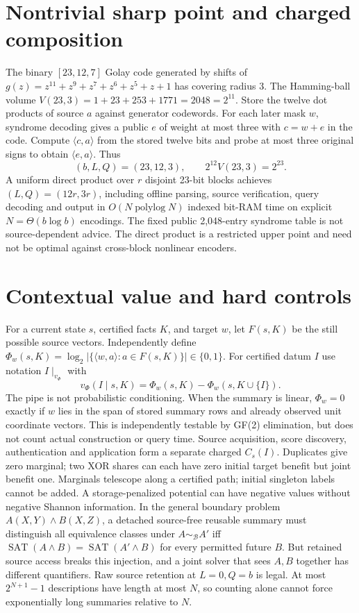 \documentclass[10pt]{article}
\begin{document}
\section{Nontrivial sharp point and charged composition}
The binary $[23,12,7]$ Golay code generated by shifts of $g(z)=z^{11}+z^9+z^7+z^6+z^5+z+1$ has covering radius $3$. The Hamming-ball volume $V(23,3)=1+23+253+1771=2048=2^{11}$. Store the twelve dot products of source $a$ against generator codewords. For each later mask $w$, syndrome decoding gives a public $e$ of weight at most three with $c=w+e$ in the code. Compute $\langle c,a\rangle$ from the stored twelve bits and probe at most three original signs to obtain $\langle e,a\rangle$. Thus
\[
 \boxed{(b,L,Q)=(23,12,3)},\qquad 2^{12}V(23,3)=2^{23}.
\]
A uniform direct product over $r$ disjoint 23-bit blocks achieves $(L,Q)=(12r,3r)$, including offline parsing, source verification, query decoding and output in $O(N\operatorname{polylog}N)$ indexed bit-RAM time on explicit $N=\Theta(b\log b)$ encodings. The fixed public 2,048-entry syndrome table is not source-dependent advice. The direct product is a restricted upper point and need not be optimal against cross-block nonlinear encoders.
\section{Contextual value and hard controls}
For a current state $s$, certified facts $K$, and target $w$, let $F(s,K)$ be the still possible source vectors. Independently define $\Phi_w(s,K)=\log_2|\{\langle w,a\rangle:a\in F(s,K)\}|\in\{0,1\}$. For certified datum $I$ use notation $I\mid_{v_\Phi}$ with
\[
 v_\Phi(I\mid s,K)=\Phi_w(s,K)-\Phi_w(s,K\cup\{I\}).
\]
The pipe is not probabilistic conditioning. When the summary is linear, $\Phi_w=0$ exactly if $w$ lies in the span of stored summary rows and already observed unit coordinate vectors. This is independently testable by GF(2) elimination, but does not count actual construction or query time. Source acquisition, score discovery, authentication and application form a separate charged $C_s(I)$. Duplicates give zero marginal; two XOR shares can each have zero initial target benefit but joint benefit one. Marginals telescope along a certified path; initial singleton labels cannot be added. A storage-penalized potential can have negative values without negative Shannon information.
In the general boundary problem $A(X,Y)\land B(X,Z)$, a detached source-free reusable summary must distinguish all equivalence classes under $A\sim_{\mathcal B}A'$ iff $\operatorname{SAT}(A\land B)=\operatorname{SAT}(A'\land B)$ for every permitted future $B$. But retained source access breaks this injection, and a joint solver that sees $A,B$ together has different quantifiers. Raw source retention at $L=0,Q=b$ is legal. At most $2^{N+1}-1$ descriptions have length at most $N$, so counting alone cannot force exponentially long summaries relative to $N$.
\end{document}
